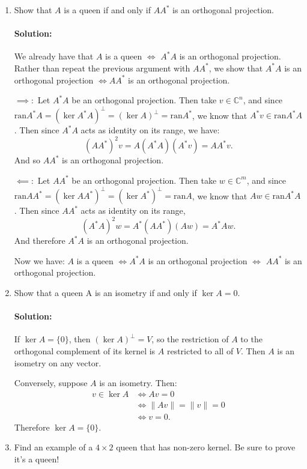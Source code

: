 \documentclass{article}
\begin{document}
\begin{enumerate}
\begin{enumerate}[label= (\alph*)]
\item Show that $A$ is a queen if and only if $AA^*$ is an orthogonal projection.
    \paragraph{Solution: }
    We already have that $A$ is a queen $\iff $ $A^* A$ is an orthogonal projection. Rather than repeat the previous argument with $A A^* $, we show that $A^* A$ is an orthogonal projection $\iff  A A^* $ is an orthogonal projection.

    $\implies:$ Let $A^* A$ be an orthogonal projection. Then take $v\in \mathbb{C}^{n}$, and since $\text{ran}A^* A=(\ker A^* A)^{\perp}=(\ker A)^{\perp}=\text{ran}A^*$, we know that $A^* v\in \text{ran}A^* A$. Then since $A^* A$ acts as identity on its range, we have:
    \[ (A A^* )^2v=A(A^* A) (A^* v)=A A^* v .\] 
    And so $A A^* $ is an orthogonal projection.

    $\impliedby:$ Let $A A^* $ be an orthogonal projection. Then take $w\in \mathbb{C}^{m}$, and since
    $\text{ran}A A^* =(\ker A A^* )^{\perp}= (\ker A^* )^{\perp}=\text{ran}A$, we know that $Aw\in \text{ran}A^* A$. Then since $A A^* $ acts as identity on its range,
    \[ (A^* A)^2w=A^* (A A^* )(Aw)=A^* Aw .\] 
    And therefore $A^* A$ is an orthogonal projection.

    Now we have: $A$ is a queen $\iff A^* A$ is an orthogonal projection $\iff$  $AA ^*$ is an orthogonal projection.

\newpage
\item Show that a queen A is an isometry if and only if $\ker A = {0}$.

    \paragraph{Solution: }If $\ker A=\{0\} $, then $(\ker A)^{\perp}=V$, so the restriction of $A$ to the orthogonal complement of its kernel is $A$ restricted to all of $V$. Then $A$ is an isometry on any vector.

    Conversely, suppose $A$ is an isometry. Then:
    \begin{align*}
        v\in \ker A&\iff Av=0\\
                   &\iff \|Av\|=\|v\|=0\\
                   &\iff v=0
    .\end{align*}
    Therefore $\ker A=\{0\} $. 

\item Find an example of a $4 \times  2$ queen that has non-zero kernel. Be sure to prove it's a queen!

\end{enumerate}
\end{enumerate}
\end{document}
